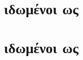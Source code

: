 



\en{\lipsum[1]}
\section{ ιδωμένοι ως }
\en{\lipsum[1]}
\section{ ιδωμένοι ως }
\en{\lipsum[1]}


